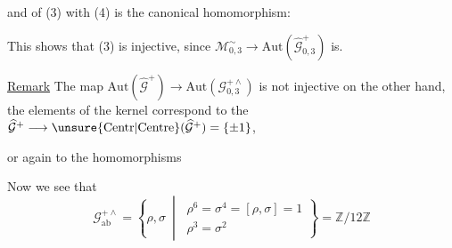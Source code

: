 
and  of (3) with (4) is the canonical
homomorphism:


This shows that (3) is injective, since
$\mathcal{M}_{0,3}^{\sim}\longrightarrow\mathrm{Aut}(\widehat{\mathcal{G}}_{0,3}^{+})$
is. 

\uline{Remark} The map
$\mathrm{Aut}(\widehat{\mathcal{G}}^{+})\longrightarrow\mathrm{Aut}(\mathcal{G}_{0,3}^{+\wedge})$
is not injective on the other hand,  the
elements of the kernel correspond to the
$\widehat{\mathcal{G}}^{+}\longrightarrow\unsure{\mathrm{Centr}|\mathrm{Centre}}(\widehat{\mathcal{G}}^{+})=\{\pm1\}$,




or again to the homomorphisms 


Now we see that
\[
\mathcal{G}_{\mathrm{ab}}^{+\wedge}
=\left\{\rho,\sigma\ \middle|\ \begin{gathered}
\rho^{6}=\sigma^{4}=[\rho,\sigma]=1\\
\rho^{3}=\sigma^{2}
\end{gathered}\right\}=\mathbb{Z}/12\mathbb{Z}
\]

